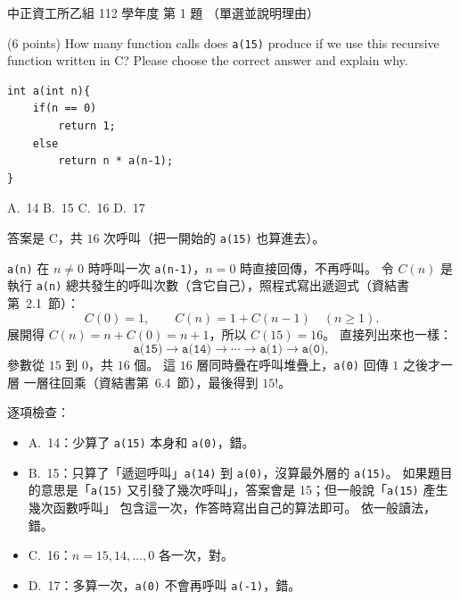 \begin{pastexam}[label={px:ccu-112-csb-01}]{中正資工所乙組 112 學年度 第 1 題}
（單選並說明理由）

(6 points) How many function calls does \texttt{a(15)} produce if we use this recursive function
written in C? Please choose the correct answer and explain why.
\begin{verbatim}
int a(int n){
    if(n == 0)
        return 1;
    else
        return n * a(n-1);
}
\end{verbatim}
A.~14 \qquad B.~15 \qquad C.~16 \qquad D.~17
\end{pastexam}

\begin{pastsoln}
答案是 C，共 $16$ 次呼叫（把一開始的 \texttt{a(15)} 也算進去）。

\texttt{a(n)} 在 $n \ne 0$ 時呼叫一次 \texttt{a(n-1)}，$n = 0$ 時直接回傳，不再呼叫。 令 $C(n)$ 是
執行 \texttt{a(n)} 總共發生的呼叫次數（含它自己），照程式寫出遞迴式（資結書第~2.1~節）：
\[
C(0) = 1, \qquad C(n) = 1 + C(n - 1) \quad (n \ge 1).
\]
展開得 $C(n) = n + C(0) = n + 1$，所以 $C(15) = 16$。 直接列出來也一樣：
\[
\texttt{a(15)} \to \texttt{a(14)} \to \cdots \to \texttt{a(1)} \to \texttt{a(0)},
\]
參數從 $15$ 到 $0$，共 $16$ 個。 這 $16$ 層同時疊在呼叫堆疊上，\texttt{a(0)} 回傳 $1$ 之後才一層
一層往回乘（資結書第~6.4~節），最後得到 $15!$。

逐項檢查：
\begin{itemize}
\item A.~14：少算了 \texttt{a(15)} 本身和 \texttt{a(0)}，錯。
\item B.~15：只算了「遞迴呼叫」\texttt{a(14)} 到 \texttt{a(0)}，沒算最外層的 \texttt{a(15)}。 如果題目
的意思是「\texttt{a(15)} 又引發了幾次呼叫」，答案會是 15；但一般說「\texttt{a(15)} 產生幾次函數呼叫」
包含這一次，作答時寫出自己的算法即可。 依一般讀法，錯。
\item C.~16：$n = 15, 14, \ldots, 0$ 各一次，對。
\item D.~17：多算一次，\texttt{a(0)} 不會再呼叫 \texttt{a(-1)}，錯。
\end{itemize}
\end{pastsoln}
